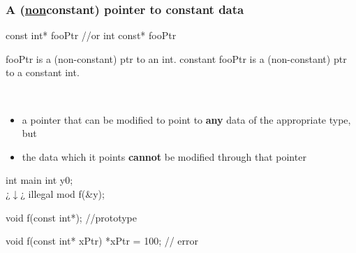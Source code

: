 \subsubsection{A (\underline{non}constant) pointer to constant data}
    \begin{minipage}{\MPWxXXXSxLISTING\textwidth} %
    \begin{CPPCode}
const int* fooPtr   //or
int const* fooPtr
    \end{CPPCode}
    \end{minipage}
\begin{minipage}{\MPWxSxLISTING\textwidth} %
    \begin{Terminal}
fooPtr is a (non-constant) ptr to an int. constant
fooPtr is a (non-constant) ptr to a constant int.
    \end{Terminal}
    \end{minipage}\\
    
\begin{itemize}
    \item a pointer that can be modified to point to \textbf{any} data of the appropriate type, but
    \item the data which it points \textbf{cannot} be modified through that pointer
\end{itemize}
\begin{minipage}{\MPWxXSxLISTING\textwidth} %
    \begin{CPPCode}
int main
{
    int y{0};
    \\ ¿$\downarrow$¿ illegal mod 
    f(&y);      
}
    \end{CPPCode}
\end{minipage}
\begin{minipage}{\MPWxXSxLISTING\textwidth} %
    \begin{CPPCode}
void f(const int*); //prototype

void f(const int* xPtr)
{
    *xPtr = 100;    // error
}
    \end{CPPCode}
\end{minipage}\\

